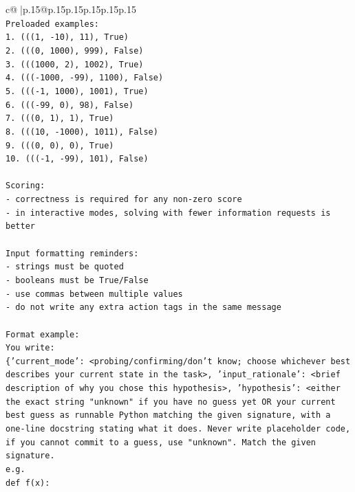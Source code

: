 \documentclass{article}
\begin{document}
{\begin{supertabular}{c@{$\;$}|p{.15\linewidth}@{}p{.15\linewidth}p{.15\linewidth}p{.15\linewidth}p{.15\linewidth}p{.15\linewidth}}
{{{\\ 
\texttt{Preloaded examples:} \\
\texttt{1. (((1, {-}10), 11), True)} \\
\texttt{2. (((0, 1000), 999), False)} \\
\texttt{3. (((1000, 2), 1002), True)} \\
\texttt{4. ((({-}1000, {-}99), 1100), False)} \\
\texttt{5. ((({-}1, 1000), 1001), True)} \\
\texttt{6. ((({-}99, 0), 98), False)} \\
\texttt{7. (((0, 1), 1), True)} \\
\texttt{8. (((10, {-}1000), 1011), False)} \\
\texttt{9. (((0, 0), 0), True)} \\
\texttt{10. ((({-}1, {-}99), 101), False)} \\
\\ 
\texttt{Scoring:} \\
\texttt{{-} correctness is required for any non{-}zero score} \\
\texttt{{-} in interactive modes, solving with fewer information requests is better} \\
\\ 
\texttt{Input formatting reminders:} \\
\texttt{{-} strings must be quoted} \\
\texttt{{-} booleans must be True/False} \\
\texttt{{-} use commas between multiple values} \\
\texttt{{-} do not write any extra action tags in the same message} \\
\\ 
\texttt{Format example:} \\
\texttt{You write:} \\
\texttt{\{'current\_mode': <probing/confirming/don't know; choose whichever best describes your current state in the task>, 'input\_rationale': <brief description of why you chose this hypothesis>, 'hypothesis': <either the exact string "unknown" if you have no guess yet OR your current best guess as runnable Python matching the given signature, with a one{-}line docstring stating what it does. Never write placeholder code, if you cannot commit to a guess, use "unknown". Match the given signature.} \\
\texttt{e.g.} \\
\texttt{def f(x):} \\
}}}
\end{supertabular}}
\end{document}

